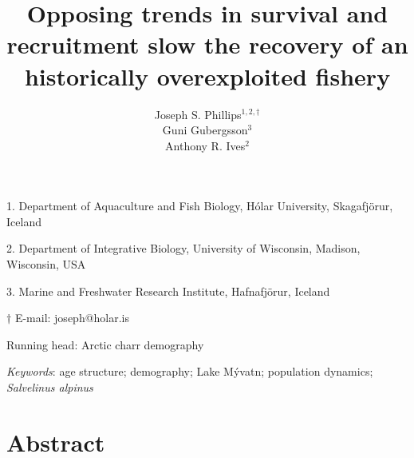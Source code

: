 \documentclass[11pt]{article}
\title{Opposing trends in survival and recruitment slow the recovery 
        of an historically overexploited fishery}
\author{
Joseph S. Phillips$^{1,2, \dagger}$ \\
Gu{\dh}ni Gu{\dh}bergsson$^{3}$ \\
Anthony R. Ives$^{2}$
}
\date{}
\begin{document}
\raggedright
\setlength\parindent{0.25in}

\maketitle


\noindent{} 1. Department of Aquaculture and Fish Biology, 
H\'{o}lar University, Skagafj\"{o}r{\dh}ur, Iceland

\noindent{} 2. Department of Integrative Biology, 
University of Wisconsin, Madison, Wisconsin, USA

\noindent{} 3. Marine and Freshwater Research Institute, Hafnafj\"{o}r{\dh}ur, Iceland

\noindent{} $\dagger$ E-mail: joseph@holar.is



\bigskip

Running head: {Arctic charr demography}

\textit{Keywords}: {age structure;
                    demography; 
                    Lake M\'{y}vatn; 
                    population dynamics; 
                    \emph{Salvelinus alpinus}}

\clearpage






\linenumbers{}

\section*{Abstract} \label{abstract}
\end{document}
